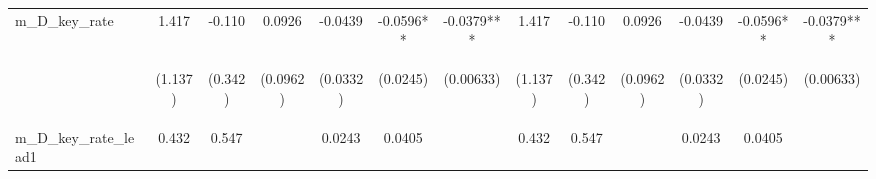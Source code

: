 \documentclass[]{article}
\begin{document}
\begin{center}
\begin{tabular}{lcccccccccccc}
m\_D\_key\_rate & 1.417 & -0.110 & 0.0926 & -0.0439 & -0.0596** & -0.0379*** & 1.417 & -0.110 & 0.0926 & -0.0439 & -0.0596** & -0.0379*** \\
\vspace{4pt} & \begin{footnotesize}(1.137)\end{footnotesize} & \begin{footnotesize}(0.342)\end{footnotesize} & \begin{footnotesize}(0.0962)\end{footnotesize} & \begin{footnotesize}(0.0332)\end{footnotesize} & \begin{footnotesize}(0.0245)\end{footnotesize} & \begin{footnotesize}(0.00633)\end{footnotesize} & \begin{footnotesize}(1.137)\end{footnotesize} & \begin{footnotesize}(0.342)\end{footnotesize} & \begin{footnotesize}(0.0962)\end{footnotesize} & \begin{footnotesize}(0.0332)\end{footnotesize} & \begin{footnotesize}(0.0245)\end{footnotesize} & \begin{footnotesize}(0.00633)\end{footnotesize} \\
m\_D\_key\_rate\_lead1 & 0.432 & 0.547 &  & 0.0243 & 0.0405 &  & 0.432 & 0.547 &  & 0.0243 & 0.0405 &  \\

\end{tabular}
\end{center}
\end{document}
